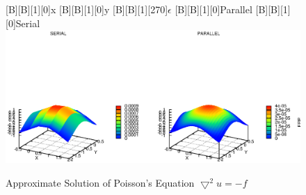 \documentclass[12pt,a4paper]{report}
\begin{document}
\begin{figure}[htb]
  [B][B][1][0]{x}
  [B][B][1][0]{y}
  [B][B][1][270]{$\epsilon$}
  [B][B][1][0]{Parallel}
  [B][B][1][0]{Serial}
  \includegraphics{./images/poiss.eps}
  \caption{Approximate Solution of Poisson's Equation
    $\bigtriangledown^{2}u=-f$}
  \label{fig:approxPoiss}
\end{figure}
\end{document}
